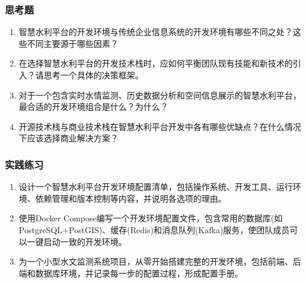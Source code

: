\subsubsection{思考题}\label{ux601dux8003ux9898}

\begin{enumerate}
\def\labelenumi{\arabic{enumi}.}
\item
  智慧水利平台的开发环境与传统企业信息系统的开发环境有哪些不同之处？这些不同主要源于哪些因素？
\item
  在选择智慧水利平台的开发技术栈时，应如何平衡团队现有技能和新技术的引入？请思考一个具体的决策框架。
\item
  对于一个包含实时水情监测、历史数据分析和空间信息展示的智慧水利平台，最合适的开发环境组合是什么？为什么？
\item
  开源技术栈与商业技术栈在智慧水利平台开发中各有哪些优缺点？在什么情况下应该选择商业解决方案？
\end{enumerate}

\subsubsection{实践练习}\label{ux5b9eux8df5ux7ec3ux4e60}

\begin{enumerate}
\def\labelenumi{\arabic{enumi}.}
\item
  设计一个智慧水利平台开发环境配置清单，包括操作系统、开发工具、运行环境、依赖管理和版本控制等内容，并说明各选项的理由。
\item
  使用Docker
  Compose编写一个开发环境配置文件，包含常用的数据库(如PostgreSQL+PostGIS)、缓存(Redis)和消息队列(Kafka)服务，使团队成员可以一键启动一致的开发环境。
\item
  为一个小型水文监测系统项目，从零开始搭建完整的开发环境，包括前端、后端和数据库环境，并记录每一步的配置过程，形成配置手册。
\end{enumerate}
